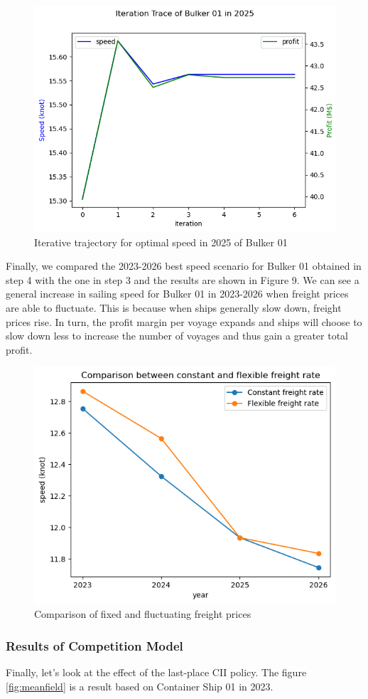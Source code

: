 \documentclass[a4paper,12pt]{article}
\begin{document}
\begin{figure}[H]
	\centering
	\includegraphics[width=0.5\linewidth]{report-fig/iterationsGEC.png}
	\caption{Iterative trajectory for optimal speed in 2025 of Bulker 01}
	\label{fig:step4}
\end{figure}

Finally, we compared the 2023-2026 best speed scenario for Bulker 01 obtained in step 4 with the one in step 3 and the results are shown in Figure 9.
We can see a general increase in sailing speed for Bulker 01 in 2023-2026 when freight prices are able to fluctuate.
This is because when ships generally slow down, freight prices rise.
In turn, the profit margin per voyage expands and ships will choose to slow down less to increase the number of voyages and thus gain a greater total profit.

\begin{figure}[H]
	\centering
	\includegraphics[width=0.5\linewidth]{report-fig/Flexible.png}
	\caption{Comparison of fixed and fluctuating freight prices}
	\label{fig:flexible}
\end{figure}

\subsubsection{Results of Competition Model}
Finally, let's look at the effect of the last-place CII policy. The figure \ref{fig:meanfield} is a result based on Container Ship 01 in 2023.\\
\end{document}

